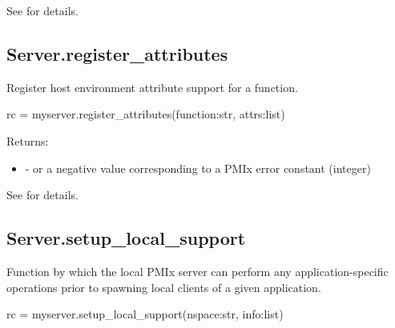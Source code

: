 See  for details.


\subsection{Server.register_attributes}

\summary
Register host environment attribute support for a function.

\format

\pyspecificstart
\begin{codepar}
rc = myserver.register_attributes(function:str, attrs:list)
\end{codepar}
\pyspecificend


\begin{arglist}
\end{arglist}

Returns:

\begin{itemize}
    \item {} -  or a negative value corresponding to a PMIx error constant (integer)
\end{itemize}

See  for details.


\subsection{Server.setup_local_support}

\summary
Function by which the local \ac{PMIx} server can perform any application-specific operations prior to spawning local clients of a given application.

\format

\pyspecificstart
\begin{codepar}
rc = myserver.setup_local_support(nspace:str, info:list)
\end{codepar}
\pyspecificend


\begin{arglist}
\end{arglist}

